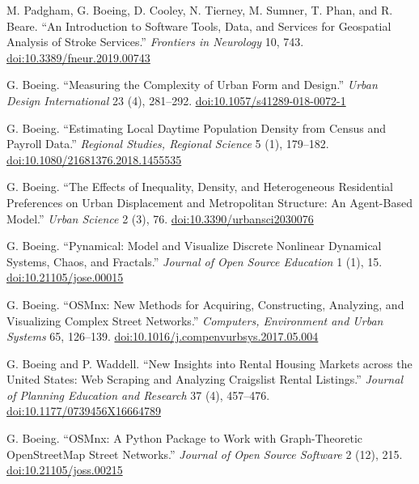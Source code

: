 \documentclass[11pt,letterpaper]{report} %
\begin{document}
\begin{tablist}
\item[2019] \tab{}M. Padgham, G. Boeing, D. Cooley, N. Tierney, M. Sumner, T. Phan, and R. Beare. \enquote{An Introduction to Software Tools, Data, and Services for Geospatial Analysis of Stroke Services.} \textit{Frontiers in Neurology} 10, 743. \href{https://doi.org/10.3389/fneur.2019.00743}{doi:10.3389/fneur.2019.00743}

\item[2018] \tab{}G. Boeing. \enquote{Measuring the Complexity of Urban Form and Design.} \textit{Urban Design International} 23 (4), 281--292. \href{https://doi.org/10.1057/s41289-018-0072-1}{doi:10.1057/s41289-018-0072-1}

\item[2018] \tab{}G. Boeing. \enquote{Estimating Local Daytime Population Density from Census and Payroll Data.} \textit{Regional Studies, Regional Science} 5 (1), 179--182. \href{https://doi.org/10.1080/21681376.2018.1455535}{doi:10.1080/21681376.2018.1455535}

\item[2018] \tab{}G. Boeing. \enquote{The Effects of Inequality, Density, and Heterogeneous Residential Preferences on Urban Displacement and Metropolitan Structure: An Agent-Based Model.} \textit{Urban Science} 2 (3), 76. \href{https://doi.org/10.3390/urbansci2030076}{doi:10.3390/urbansci2030076}

\item[2018] \tab{}G. Boeing. \enquote{Pynamical: Model and Visualize Discrete Nonlinear Dynamical Systems, Chaos, and Fractals.} \textit{Journal of Open Source Education} 1 (1), 15. \href{https://doi.org/10.21105/jose.00015}{doi:10.21105/jose.00015}

\item[2017] \tab{}G. Boeing. \enquote{OSMnx: New Methods for Acquiring, Constructing, Analyzing, and Visualizing Complex Street Networks.} \textit{Computers, Environment and Urban Systems} 65, 126--139. \href{https://doi.org/10.1016/j.compenvurbsys.2017.05.004}{doi:10.1016/j.compenvurbsys.2017.05.004}

\item[2017] \tab{}G. Boeing and P. Waddell. \enquote{New Insights into Rental Housing Markets across the United States: Web Scraping and Analyzing Craigslist Rental Listings.} \textit{Journal of Planning Education and Research} 37 (4), 457--476. \href{https://doi.org/10.1177/0739456X16664789}{doi:10.1177/0739456X16664789}

\item[2017] \tab{}G. Boeing. \enquote{OSMnx: A Python Package to Work with Graph-Theoretic OpenStreetMap Street Networks.} \textit{Journal of Open Source Software} 2 (12), 215. \href{https://doi.org/10.21105/joss.00215}{doi:10.21105/joss.00215}


\end{tablist}
\end{document}
